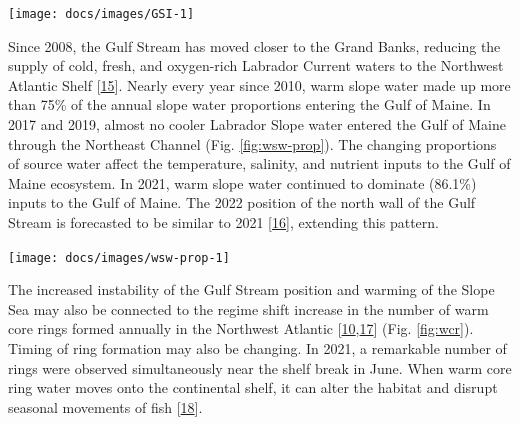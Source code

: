 \documentclass[
  10pt,
]{article}
\let\origfigure\figure
\let\endorigfigure\endfigure
\renewenvironment{figure}[1][2] {
    \expandafter\origfigure\expandafter[H]
} {
    \endorigfigure
}
\begin{document}
\begin{figure}

{\centering \texttt{[image: docs/images/GSI-1]} 

}

\caption{Index representing changes in the location of the Gulf Stream north wall. Positive values represent a more northerly Gulf Stream position.}\label{fig:GSI}
\end{figure}

Since 2008, the Gulf Stream has moved closer to the Grand Banks,
reducing the supply of cold, fresh, and oxygen-rich Labrador Current
waters to the Northwest Atlantic Shelf
{[}\protect\hyperlink{ref-goncalves_neto_changes_2021}{15}{]}. Nearly
every year since 2010, warm slope water made up more than 75\% of the
annual slope water proportions entering the Gulf of Maine. In 2017 and
2019, almost no cooler Labrador Slope water entered the Gulf of Maine
through the Northeast Channel (Fig. \ref{fig:wsw-prop}). The changing
proportions of source water affect the temperature, salinity, and
nutrient inputs to the Gulf of Maine ecosystem. In 2021, warm slope
water continued to dominate (86.1\%) inputs to the Gulf of Maine. The
2022 position of the north wall of the Gulf Stream is forecasted to be
similar to 2021
{[}\protect\hyperlink{ref-silver_forecasting_2021}{16}{]}, extending
this pattern.

\begin{figure}

{\centering \texttt{[image: docs/images/wsw-prop-1]} 

}

\caption{Proportion of Warm Slope Water (WSW) and Labrador Slope Water (LSLW) entering the Gulf of Maine through the Northeast Channel.}\label{fig:wsw-prop}
\end{figure}

The increased instability of the Gulf Stream position and warming of the
Slope Sea may also be connected to the regime shift increase in the
number of warm core rings formed annually in the Northwest Atlantic
{[}\protect\hyperlink{ref-gangopadhyay_census_2020}{10},\protect\hyperlink{ref-gangopadhyay_observed_2019}{17}{]}
(Fig. \ref{fig:wcr}). Timing of ring formation may also be changing. In
2021, a remarkable number of rings were observed simultaneously near the
shelf break in June. When warm core ring water moves onto the
continental shelf, it can alter the habitat and disrupt seasonal
movements of fish
{[}\protect\hyperlink{ref-gawarkiewicz_changing_2018}{18}{]}.
\end{document}
